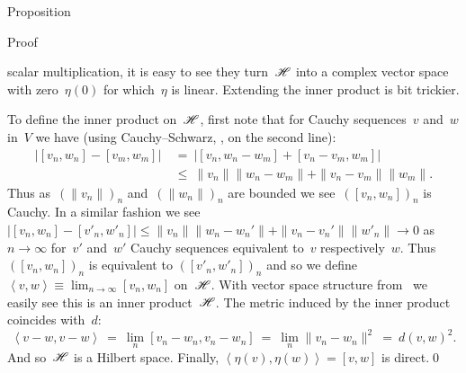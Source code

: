 \documentclass[b]{subfiles}
\begin{document}
\begin{parsec}
\begin{point}{Proposition}
\begin{point}{Proof}
\begin{point}
    scalar multiplication, it is easy to see
    they turn~$\mathscr{H}$ into a complex vector space with zero~$\eta(0)$
    for which~$\eta$ is linear.
Extending the inner product is bit trickier.
\end{point}
\begin{point}%
To define the inner product on~$\mathscr{H}$,
first note that for Cauchy sequences~$v$ and~$w$ in~$V$
we have (using Cauchy--Schwarz, , on the second line):
\begin{align*}
    \bigl|[v_n,w_n] - [v_m,w_m]\bigr|
    & \ =\  \bigl|[v_n,w_n-w_m] + [v_n - v_m,w_m]\bigr| \\
    & \ \leq\  \|v_n\| \|w_n - w_m\| + \|v_n-v_m\|\|w_m\|.
\end{align*}
Thus as~$(\|v_n\|)_n$ and~$(\|w_n\|)_n$ are bounded
we see~$([v_n,w_n])_n$ is Cauchy.
In a similar fashion we see~$\bigl|[v_n,w_n] - [v'_n,w'_n]\bigr|
    \leq \|v_n\| \|w_n - w_n'\| + \|v_n-v_n'\|\|w'_n\|\to 0$ as~$n\to \infty$
    for~$v'$ and~$w'$ Cauchy sequences equivalent
to~$v$ respectively~$w$.
Thus
$([v_n,w_n])_n$ is equivalent to
$([v'_n,w'_n])_n$
    and so
    we define~$\left<v,w\right>
        \equiv \lim_{n\to \infty} [v_n,w_n]$ on~$\mathscr{H}$.
With vector space structure from~
we easily see this is an inner product~$\mathscr{H}$.
The metric induced by the inner product coincides with~$d$:
\begin{equation*}
    \left<v-w,v-w\right>
   \ =\ \lim_{n}[v_n-w_n,v_n-w_n]
    \ =\ \lim_{n}\|v_n-w_n\|^2
    \ =\  d(v,w)^2.
\end{equation*}
And so~$\mathscr{H}$ is a Hilbert space.
Finally, $\left<\eta(v),\eta(w)\right>=[v,w]$ is direct.\qed
\end{point}
\end{point}
\end{point}
\end{parsec}
\end{document}
